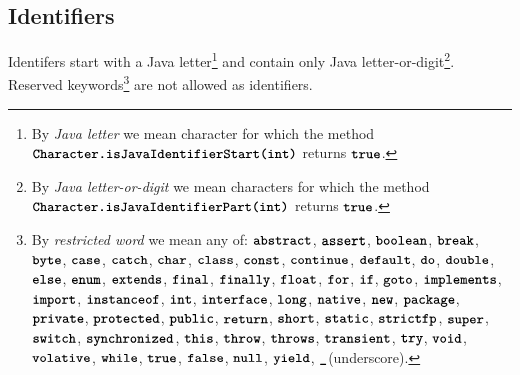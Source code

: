 \subsection*{Identifiers}

Identifers start with a
Java letter\footnote{
By \emph{Java letter}
we mean character for which the method $\textbf{\texttt{Character.isJavaIdentifierStart(int)}}$ returns $\textbf{\texttt{true}}$.
} and contain only
Java letter-or-digit\footnote{
By \emph{Java letter-or-digit}
we mean characters for which the method $\textbf{\texttt{Character.isJavaIdentifierPart(int)}}$ returns $\textbf{\texttt{true}}$.
}.
Reserved keywords\footnote{
By \emph{restricted word} we mean any of:
$\textbf{\texttt{abstract}}$,
$\textbf{\texttt{assert}}$,
$\textbf{\texttt{boolean}}$,
$\textbf{\texttt{break}}$,
$\textbf{\texttt{byte}}$,
$\textbf{\texttt{case}}$,
$\textbf{\texttt{catch}}$,
$\textbf{\texttt{char}}$,
$\textbf{\texttt{class}}$,
$\textbf{\texttt{const}}$,
$\textbf{\texttt{continue}}$,
$\textbf{\texttt{default}}$,
$\textbf{\texttt{do}}$,
$\textbf{\texttt{double}}$,
$\textbf{\texttt{else}}$,
$\textbf{\texttt{enum}}$,
$\textbf{\texttt{extends}}$,
$\textbf{\texttt{final}}$,
$\textbf{\texttt{finally}}$,
$\textbf{\texttt{float}}$,
$\textbf{\texttt{for}}$,
$\textbf{\texttt{if}}$,
$\textbf{\texttt{goto}}$,
$\textbf{\texttt{implements}}$,
$\textbf{\texttt{import}}$,
$\textbf{\texttt{instanceof}}$,
$\textbf{\texttt{int}}$,
$\textbf{\texttt{interface}}$,
$\textbf{\texttt{long}}$,
$\textbf{\texttt{native}}$,
$\textbf{\texttt{new}}$,
$\textbf{\texttt{package}}$,
$\textbf{\texttt{private}}$,
$\textbf{\texttt{protected}}$,
$\textbf{\texttt{public}}$,
$\textbf{\texttt{return}}$,
$\textbf{\texttt{short}}$,
$\textbf{\texttt{static}}$,
$\textbf{\texttt{strictfp}}$,
$\textbf{\texttt{super}}$,
$\textbf{\texttt{switch}}$,
$\textbf{\texttt{synchronized}}$,
$\textbf{\texttt{this}}$,
$\textbf{\texttt{throw}}$,
$\textbf{\texttt{throws}}$,
$\textbf{\texttt{transient}}$,
$\textbf{\texttt{try}}$,
$\textbf{\texttt{void}}$,
$\textbf{\texttt{volative}}$,
$\textbf{\texttt{while}}$,
$\textbf{\texttt{true}}$,
$\textbf{\texttt{false}}$,
$\textbf{\texttt{null}}$,
$\textbf{\texttt{yield}}$,
$\textbf{\texttt{\_}}$(underscore).
} are not allowed as identifiers.
